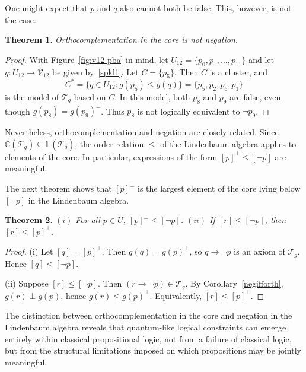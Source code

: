 \documentclass{article}   	%
\theoremstyle{plain}
\newtheorem{theorem}{Theorem}[section]
\theoremstyle{definition}
\theoremstyle{remark}
\begin{document}
One might expect that $p$ and $q$ also cannot both be false.
This, however, is not the case.

\begin{theorem}
\label{notneg}
Orthocomplementation in the core is not negation.
\end{theorem}

\begin{proof}
With Figure~\ref{fig:v12-pba} in mind, let
$U_{12}=\{p_0,p_1,\dots,p_{11}\}$ and let $g:U_{12}\to\mathcal V_{12}$ be
given by~\eqref{spkl1}.
Let $C=\{p_5\}$.
Then $C$ is a cluster, and
\begin{equation}
\label{eq:negexample}
C^*=\{q\in U_{12}: g(p_5)\le g(q)\}
     =\{p_5,p_2,p_6,p_1\}
\end{equation}
is the model of $\mathcal T_g$ based on $C$.
In this model, both $p_8$ and $p_9$ are false, even though
$g(p_8)=g(p_9)^\perp$.
Thus $p_8$ is not logically equivalent to $\neg p_9$.
\end{proof}

Nevertheless, orthocomplementation and negation are closely related.
Since $\mathbb C(\mathcal T_g)\subseteq\mathbb L(\mathcal T_g)$, the order
relation $\le$ of the Lindenbaum algebra applies to elements of the core.
In particular, expressions of the form
$[p]^\perp\le[\neg p]$ are meaningful.

The next theorem shows that $[p]^\perp$ is the largest element of the core
lying below $[\neg p]$ in the Lindenbaum algebra.

\begin{theorem}
\label{negorth1}
$(i)$ For all $p\in U$, $[p]^\perp\le[\neg p]$. 
$(ii)$ If $[r]\le[\neg p]$, then $[r]\le[p]^\perp$.
\end{theorem}

\begin{proof}
(i) Let $[q]=[p]^\perp$.
Then $g(q)=g(p)^\perp$, so $q\to\neg p$ is an axiom of $\mathcal T_g$.
Hence $[q]\le[\neg p]$.

\smallskip

(ii) Suppose $[r]\le[\neg p]$.
Then $(r\to\neg p)\in\mathcal T_g$.
By Corollary~\ref{negifforth}, $g(r)\perp g(p)$, hence
$g(r)\le g(p)^\perp$.
Equivalently, $[r]\le[p]^\perp$.
\end{proof}
The distinction between orthocomplementation in the core and negation in the Lindenbaum algebra reveals that quantum-like logical constraints can emerge entirely within classical propositional logic, not from a failure of classical logic, but from the structural limitations imposed on which propositions may be jointly meaningful.
\end{document}
